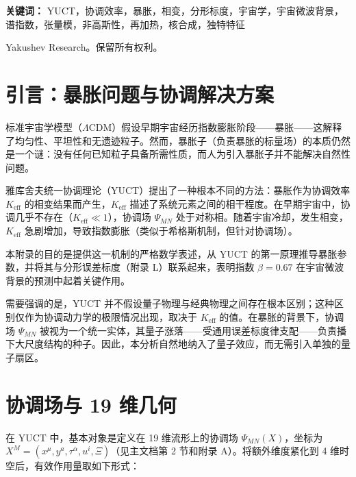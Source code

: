 \documentclass[12pt]{article}
\theoremstyle{remark}
\newcommand{\Keff}{K_{\mathrm{eff}}}
\begin{document}
\begin{titlepage}
\begin{center}
			\vspace{0.5cm}
			
			\noindent
			\small\textbf{关键词：} YUCT，协调效率，暴胀，相变，分形标度，宇宙学，宇宙微波背景，谱指数，张量模，非高斯性，再加热，核合成，独特特征
			
			\vspace{0.5cm}
			
			\noindent
			 Yakushev Research。保留所有权利。
		\end{center}
	\end{titlepage}
	
	\tableofcontents
	\newpage
	
	\section{引言：暴胀问题与协调解决方案}
	\label{sec:intro}
	
	标准宇宙学模型（$\Lambda$CDM）假设早期宇宙经历指数膨胀阶段——暴胀——这解释了均匀性、平坦性和无遗迹粒子。然而，暴胀子（负责暴胀的标量场）的本质仍然是一个谜：没有任何已知粒子具备所需性质，而人为引入暴胀子并不能解决自然性问题。
	
	雅库舍夫统一协调理论（YUCT）提出了一种根本不同的方法：暴胀作为协调效率 $\Keff$ 的相变结果而产生，$\Keff$ 描述了系统元素之间的相干程度。在早期宇宙中，协调几乎不存在（$\Keff \ll 1$），协调场 $\Psi_{MN}$ 处于对称相。随着宇宙冷却，发生相变，$\Keff$ 急剧增加，导致指数膨胀（类似于希格斯机制，但针对协调场）。
	
	本附录的目的是提供这一机制的严格数学表述，从 YUCT 的第一原理推导暴胀参数，并将其与分形误差标度（附录 L）联系起来，表明指数 $\beta = 0.67$ 在宇宙微波背景的预测中起着关键作用。
	
	需要强调的是，YUCT 并不假设量子物理与经典物理之间存在根本区别；这种区别仅作为协调动力学的极限情况出现，取决于 $K_{\mathrm{eff}}$ 的值。在暴胀的背景下，协调场 $\Psi_{MN}$ 被视为一个统一实体，其量子涨落——受通用误差标度律支配——负责播下大尺度结构的种子。因此，本分析自然地纳入了量子效应，而无需引入单独的量子扇区。
	
	\section{协调场与 19 维几何}
	\label{sec:field}
	
	在 YUCT 中，基本对象是定义在 19 维流形上的协调场 $\Psi_{MN}(X)$，坐标为 $X^M = (x^\mu, y^a, \tau^\alpha, u^i, \Xi)$（见主文档第 2 节和附录 A）。将额外维度紧化到 4 维时空后，有效作用量取如下形式：
	
\end{document}
